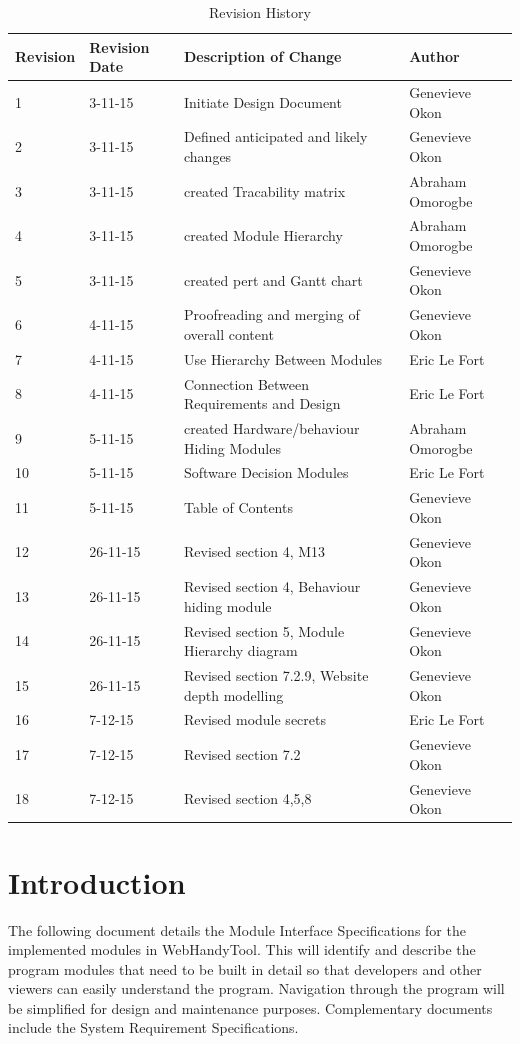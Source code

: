 \documentclass[titlepage]{article}
\begin{document}
\begin{table}[h!]
	\begin{tabular}{| p{5cm} | p{5cm} | p{5cm} |p{5cm} |}    \hline
Revision  &Revision Date &Description of Change &Author\\ \hline
1& 3-11-15& Initiate Design Document&Genevieve Okon\\ \hline
2& 3-11-15& Defined anticipated and likely changes&Genevieve Okon\\ \hline
3& 3-11-15& created Tracability matrix &Abraham Omorogbe\\ \hline
4& 3-11-15& created  Module Hierarchy&Abraham Omorogbe\\ \hline
5& 3-11-15&created pert and Gantt chart&Genevieve Okon\\ \hline
6& 4-11-15& Proofreading and merging of overall content&Genevieve Okon\\ \hline
7& 4-11-15& Use Hierarchy Between Modules&Eric Le Fort\\ \hline
8& 4-11-15&Connection Between Requirements and Design&Eric Le Fort\\ \hline
9& 5-11-15& created Hardware/behaviour Hiding Modules&Abraham Omorogbe\\ \hline
10& 5-11-15& Software Decision Modules&Eric Le Fort\\ \hline
11& 5-11-15& Table of Contents&Genevieve Okon\\ \hline


12& 26-11-15&Revised section 4, M13&Genevieve Okon\\ \hline
13& 26-11-15&Revised section 4, Behaviour hiding module&Genevieve Okon\\ \hline
14& 26-11-15&Revised section 5, Module Hierarchy diagram&Genevieve Okon\\ \hline
15& 26-11-15&Revised section 7.2.9, Website depth modelling&Genevieve Okon\\ \hline
16& 7-12-15& Revised module secrets& Eric Le Fort \\ \hline
17& 7-12-15&Revised section 7.2&Genevieve Okon\\ \hline
18& 7-12-15&Revised section 4,5,8 &Genevieve Okon\\ \hline
       \end{tabular}
       
       \caption{Revision History}
       \label{table:Revision History}
\end{table}



\section{Introduction}
The following document details the Module Interface Specifications for the implemented modules in WebHandyTool. This will identify and describe the program modules that need to be built in detail so that developers and other viewers can easily understand the program.  Navigation through the program will be simplified for design and maintenance purposes. Complementary documents include the System Requirement Specifications.\\
\end{document}

